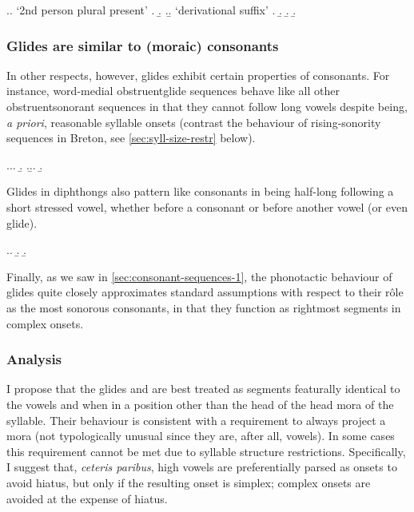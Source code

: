 \ex.\a. `2nd person plural present'
\a.
\b.
\z.\b. `derivational suffix'
\a.
\b.
\b.
\b.


\subsubsection{Glides are similar to (moraic) consonants}
\label{sec:glid-have-cons}

In other respects, however, glides exhibit certain properties of consonants. For instance, word-medial obstruent\endash glide sequences behave like all other obstruent\endash sonorant sequences in that they cannot follow long vowels despite being, \emph{a priori}, reasonable syllable onsets (contrast the behaviour of rising\hyp sonority sequences in Breton, see \cref{sec:syll-size-restr} below).

\ex.\a.\a.
\b.
\z.\b.\a.
\b.

Glides in diphthongs also pattern like consonants in being half-long following a short stressed vowel, whether before a consonant or before another vowel (or even glide).

\ex.\a.
\b.
\b.

Finally, as we saw in \cref{sec:consonant-sequences-1}, the phonotactic behaviour of glides quite closely approximates standard assumptions with respect to their rôle as the most sonorous consonants, in that they function as rightmost segments in complex onsets.

\subsubsection{Analysis}
\label{sec:analysis-9}


I propose that the glides \ipa{[w]} and \ipa{[j]} are best treated as segments featurally identical to the vowels \ipa{[u]} and \ipa{[i]} when in a position other than the head of the head mora of the syllable. Their behaviour is consistent with a requirement to always project a mora (not typologically unusual since they are, after all, vowels). In some cases this requirement cannot be met due to syllable structure restrictions. Specifically, I suggest that, \emph{ceteris paribus}, high vowels are preferentially parsed as onsets to avoid hiatus, but only if the resulting onset is simplex; complex onsets are avoided at the expense of hiatus.

